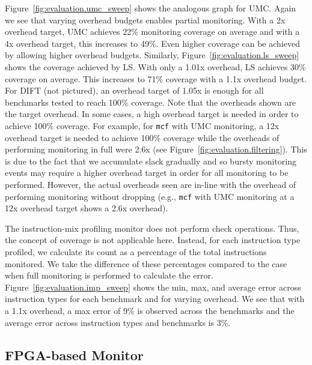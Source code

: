 Figure~\ref{fig:evaluation.umc_sweep} shows the analogous graph for UMC. Again
we see that varying overhead budgets enables partial monitoring.
With a 2x overhead target, UMC achieves 22\% monitoring coverage on average and with a 4x overhead target, this increases to 49\%.
Even higher coverage can be achieved by allowing higher overhead budgets.
Similarly, Figure~\ref{fig:evaluation.ls_sweep} shows the coverage achieved by LS.
With only a 1.01x overhead, LS achieves 30\% coverage on average. This increases to
71\% coverage with a 1.1x overhead budget. 
For DIFT (not pictured), an overhead target of 1.05x is enough for
all benchmarks tested to reach 100\% coverage.
Note that the overheads shown are the target overhead. In some cases, a high
overhead target is needed in order to achieve 100\% coverage. For example, for
{\tt mcf} with UMC monitoring, a 12x overhead target is needed to achieve 100\%
coverage while the overheads of performing monitoring in full were 2.6x (see
Figure~\ref{fig:evaluation.filtering}). This is due to the fact that we
accumulate slack gradually and so bursty monitoring events may require a higher
overhead target in order for all monitoring to be performed. However, the
actual overheads seen are in-line with the overhead of performing monitoring
without dropping (e.g., {\tt mcf} with UMC monitoring at a 12x
overhead target shows a 2.6x overhead).

The instruction-mix profiling monitor does not perform check operations. Thus,
the concept of coverage is not applicable here. Instead, for each instruction
type profiled, we calculate its count as a percentage of the total instructions
monitored. We take the difference of these percentages compared to the case
when full monitoring
is performed to calculate the error. Figure~\ref{fig:evaluation.imp_sweep}
shows the min, max, and average error across
instruction types for each benchmark and for varying overhead. We see that
with a 1.1x overhead, a max error of 9\% is observed across the benchmarks and the
average error across instruction types and benchmarks is 3\%. 

\subsection{FPGA-based Monitor}
\label{sec:evaluation.fpga}

